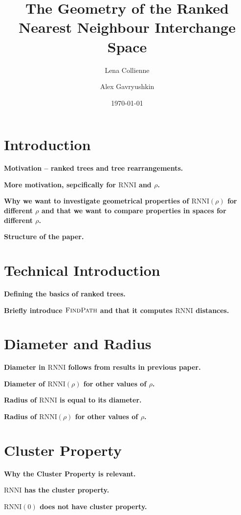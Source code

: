 \documentclass[11pt]{amsart}
\title[Geometry of ranked tree spaces]{The Geometry of the Ranked Nearest Neighbour Interchange Space}
\date{\today}
\author{Lena Collienne}
\author{Alex Gavryushkin\textsuperscript{\Letter}}
\newcommand{\rnni}{\mathrm{RNNI}}
\newcommand{\findpath}{\textsc{FindPath}}
\newcommand{\summary}[1]{\textbf{#1}} %
\begin{document}
\maketitle

\begin{abstract}
\end{abstract}

\section{Introduction}

\summary{Motivation -- ranked trees and tree rearrangements.}

\summary{More motivation, sepcifically for $\rnni$ and $\rho$.}

\summary{Why we want to investigate geometrical properties of $\rnni(\rho)$ for different $\rho$ and that we want to compare properties in spaces for different $\rho$.}

\summary{Structure of the paper.}

\section{Technical Introduction}

\summary{Defining the basics of ranked trees.}

\summary{Briefly introduce $\findpath$ and that it computes $\rnni$ distances.}

\section{Diameter and Radius}

\summary{Diameter in $\rnni$ follows from results in previous paper.}

\summary{Diameter of $\rnni(\rho)$ for other values of $\rho$.}

\summary{Radius of $\rnni$ is equal to its diameter.}

\summary{Radius of $\rnni(\rho)$ for other values of $\rho$.}

\section{Cluster Property}

\summary{Why the Cluster Property is relevant.}

\summary{$\rnni$ has the cluster property.}

\summary{$\rnni(0)$ does not have cluster property.}
\end{document}
